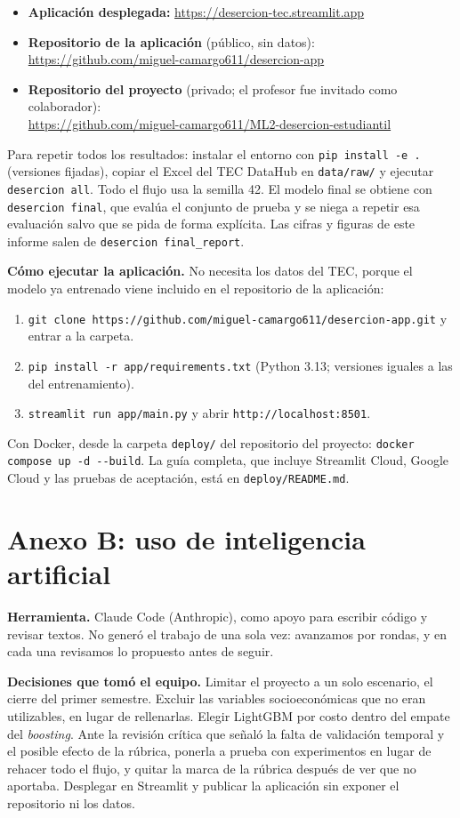 \documentclass[11pt,a4paper]{article}
\newcommand{\repo}{\url{https://github.com/miguel-camargo611/ML2-desercion-estudiantil}}
\newcommand{\repoapp}{\url{https://github.com/miguel-camargo611/desercion-app}}
\newcommand{\appurl}{\url{https://desercion-tec.streamlit.app}}
\begin{document}
\begin{itemize}[leftmargin=1.3em,itemsep=2pt,topsep=2pt]
\item \textbf{Aplicación desplegada:} \appurl
\item \textbf{Repositorio de la aplicación} (público, sin datos):\\ \repoapp
\item \textbf{Repositorio del proyecto} (privado; el profesor fue invitado como colaborador):\\ \repo
\end{itemize}
Para repetir todos los resultados: instalar el entorno con \texttt{pip install -e .} (versiones fijadas), copiar el Excel del TEC DataHub en \texttt{data/raw/} y ejecutar \texttt{desercion all}. Todo el flujo usa la semilla 42. El modelo final se obtiene con \texttt{desercion final}, que evalúa el conjunto de prueba y se niega a repetir esa evaluación salvo que se pida de forma explícita. Las cifras y figuras de este informe salen de \texttt{desercion final\_report}.

\textbf{Cómo ejecutar la aplicación.} No necesita los datos del TEC, porque el modelo ya entrenado viene incluido en el repositorio de la aplicación:
\begin{enumerate}[leftmargin=1.5em,itemsep=1pt,topsep=2pt]
\item \texttt{git clone https://github.com/miguel-camargo611/desercion-app.git} y entrar a la carpeta.
\item \texttt{pip install -r app/requirements.txt} (Python 3.13; versiones iguales a las del entrenamiento).
\item \texttt{streamlit run app/main.py} y abrir \texttt{http://localhost:8501}.
\end{enumerate}
Con Docker, desde la carpeta \texttt{deploy/} del repositorio del proyecto: \texttt{docker compose up -d -{}-build}. La guía completa, que incluye Streamlit Cloud, Google Cloud y las pruebas de aceptación, está en \texttt{deploy/README.md}.

\section*{Anexo B: uso de inteligencia artificial}

\textbf{Herramienta.} Claude Code (Anthropic), como apoyo para escribir código y revisar textos. No generó el trabajo de una sola vez: avanzamos por rondas, y en cada una revisamos lo propuesto antes de seguir.

\textbf{Decisiones que tomó el equipo.} Limitar el proyecto a un solo escenario, el cierre del primer semestre. Excluir las variables socioeconómicas que no eran utilizables, en lugar de rellenarlas. Elegir LightGBM por costo dentro del empate del \textit{boosting}. Ante la revisión crítica que señaló la falta de validación temporal y el posible efecto de la rúbrica, ponerla a prueba con experimentos en lugar de rehacer todo el flujo, y quitar la marca de la rúbrica después de ver que no aportaba. Desplegar en Streamlit y publicar la aplicación sin exponer el repositorio ni los datos.
\end{document}
